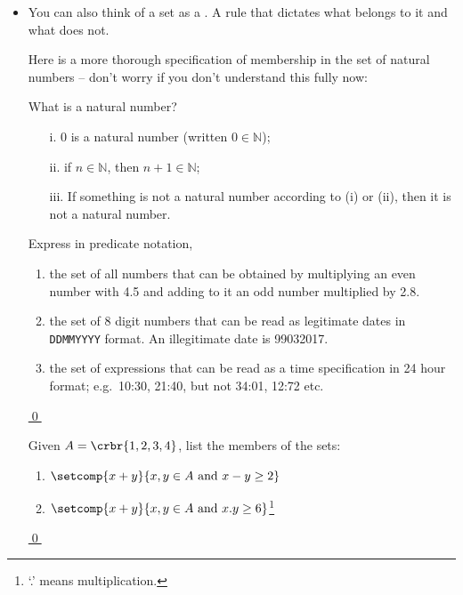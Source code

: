 \documentclass[11pt]{article}
\begin{document}
\begin{itemize}

\item You can also think of a set as a . A rule that dictates what
belongs to it and what does not.

\item[] Here is a more thorough specification of membership in the set of natural
numbers -- don't worry if you don't
understand this fully now:


\hrulefill
\begin{udefinition}{What is a natural number?}
\begin{itemize}
\item[i.] 0 is a natural number (written $0\in\mathbb{N}$);
\item[ii.] if $n\in\mathbb{N}$, then  $n+1\in\mathbb{N}$; 
\item[iii.] If something is not a natural number according to (i) or (ii), then
it is not a natural number.
\end{itemize}
\end{udefinition}
\hrulefill


\hrulefill
\begin{uexercise} \label{ex-pred}
Express in predicate notation,
\begin{enumerate}
\item the set of all numbers that can be obtained by multiplying an even
number with 4.5 and adding to it an odd number multiplied by 2.8. 
\item the set of 8 digit numbers that can be read as legitimate dates in
\mbox{\texttt{DDMMYYYY}} format. An illegitimate date is 99032017.
\item the set of expressions that can be read as a time specification in 24
hour format; e.g.\ 10:30, 21:40, but not 34:01, 12:72 etc.
\end{enumerate}

\hyperref[ex-pred-sol]{\qed}
\end{uexercise}

\begin{uexercise} \label{ex-pred2}
Given $A = \crbr{1,2,3,4}$, list the members of the sets:
\begin{enumerate}
\item\label{ex-pred2-a} $\setcomp{x+y}{x,y\in A \text{ and } x-y \geq 2}$
\item\label{ex-pred2-b} $\setcomp{x+y}{x,y\in A \text{ and } x.y \geq 6}$\footnote{`.' means
multiplication.}
\end{enumerate}
\hyperlink{ex-pred2-sol}{\qed}
\end{uexercise}
\hrulefill
\end{itemize}
\end{document}
